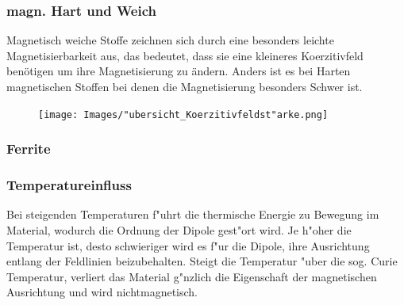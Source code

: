         \subsubsection*{magn. Hart und Weich}
            Magnetisch weiche Stoffe zeichnen sich durch eine besonders leichte Magnetisierbarkeit aus, das bedeutet,
            dass sie eine kleineres Koerzitivfeld benötigen um ihre Magnetisierung zu ändern. Anders ist es bei Harten
            magnetischen Stoffen bei denen die Magnetisierung besonders Schwer ist.
            \begin{figure}[H]
                \centering
                \texttt{[image: Images/"ubersicht\_Koerzitivfeldst"arke.png]}
            \end{figure}
        \subsubsection*{Ferrite}

        \subsubsection*{Temperatureinfluss}
            Bei steigenden Temperaturen f"uhrt die thermische Energie zu Bewegung im Material, wodurch die Ordnung der
            Dipole gest"ort wird. Je h"oher die Temperatur ist, desto schwieriger wird es f"ur die Dipole, ihre Ausrichtung entlang
            der Feldlinien beizubehalten. Steigt die Temperatur "uber die sog. Curie Temperatur, verliert das Material g"nzlich
            die Eigenschaft der magnetischen Ausrichtung und wird nichtmagnetisch.
